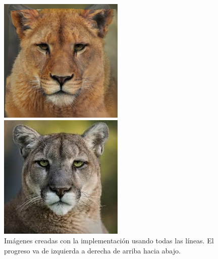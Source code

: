\documentclass[conference]{IEEEtran}
\begin{document}
\begin{figure}[H]
\begin{multicols}{3}
    \includegraphics[width=1.0\linewidth]{results/cats/XL/img20.png} \par
    \includegraphics[width=1.0\linewidth]{results/cats/XL/img50.png} \par
\end{multicols}
\caption{Imágenes creadas con la implementación usando todas las líneas. El progreso va de izquierda a derecha de arriba hacia abajo.}
\end{figure}
	
\end{document}
